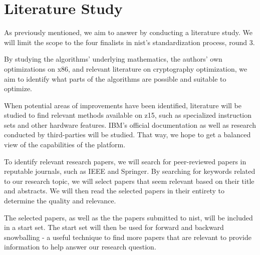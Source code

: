 \section{Literature Study}
\label{section:method:literature-study}

As previously mentioned, we aim to answer  by conducting a literature study. We will limit the scope to the four finalists in \gls{nist}'s standardization process, round 3.

By studying the algorithms' underlying mathematics, the authors' own optimizations on \gls{x86}, and relevant literature on cryptography optimization, we aim to identify what parts of the algorithms are possible and suitable to optimize.

When potential areas of improvements have been identified, literature will be studied to find relevant methods available on \gls{z15}, such as specialized instruction sets and other hardware features. IBM's official documentation as well as research conducted by third-parties will be studied. That way, we hope to get a balanced view of the capabilities of the platform.

To identify relevant research papers, we will search for peer-reviewed papers in reputable journals, such as IEEE and Springer. By searching for keywords related to our research topic, we will select papers that seem relevant based on their title and abstracts. We will then read the selected papers in their entirety to determine the quality and relevance.

The selected papers, as well as the the papers submitted to \gls{nist}, will be included in a start set. The start set will then be used for forward and backward snowballing - a useful technique to find more papers that are relevant to provide information to help answer our research question\cite{wohlin2014}.

